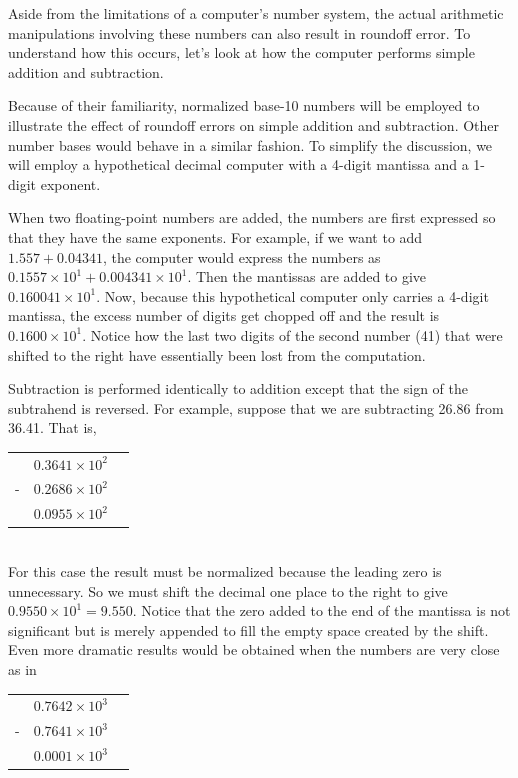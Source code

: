 \documentclass[../main.tex]{subfiles}
\begin{document}
\noindent
Aside from the limitations of a computer's number system, the actual arithmetic manipulations
involving these numbers can also result in roundoff error. To understand how this
occurs, let's look at how the computer performs simple addition and subtraction.

Because of their familiarity, normalized base-10 numbers will be employed to illustrate
the effect of roundoff errors on simple addition and subtraction. Other number bases
would behave in a similar fashion. To simplify the discussion, we will employ a hypothetical
decimal computer with a 4-digit mantissa and a 1-digit exponent.

When two floating-point numbers are added, the numbers are first expressed so that
they have the same exponents. For example, if we want to add $1.557 + 0.04341$, the computer
would express the numbers as \\$0.1557\times 10^1 + 0.004341\times 10^1$. Then the mantissas
are added to give $0.160041 \times 10^1$. Now, because this hypothetical computer only carries a
4-digit mantissa, the excess number of digits get chopped off and the result is $0.1600\times 10^1$.
Notice how the last two digits of the second number (41) that were shifted to the right have
essentially been lost from the computation.

Subtraction is performed identically to addition except that the sign of the subtrahend
is reversed. For example, suppose that we are subtracting 26.86 from 36.41. That is,\\

\begin{tabular}{c c c}
        & $0.3641 \times 10^2$\\
    -   & $0.2686 \times 10^2$\\
        \hline
        & $0.0955 \times 10^2$\\
\end{tabular}\\

For this case the result must be normalized because the leading zero is unnecessary. So
we must shift the decimal one place to the right to give $0.9550 \times 10^1 = 9.550$. Notice that
the zero added to the end of the mantissa is not significant but is merely appended to fill the
empty space created by the shift. Even more dramatic results would be obtained when the
numbers are very close as in\\

\begin{tabular}{c c c}
    & $0.7642 \times 10^3$\\
-   & $0.7641 \times 10^3$\\
    \hline
    & $0.0001 \times 10^3$\\
\end{tabular}\\
\end{document}
